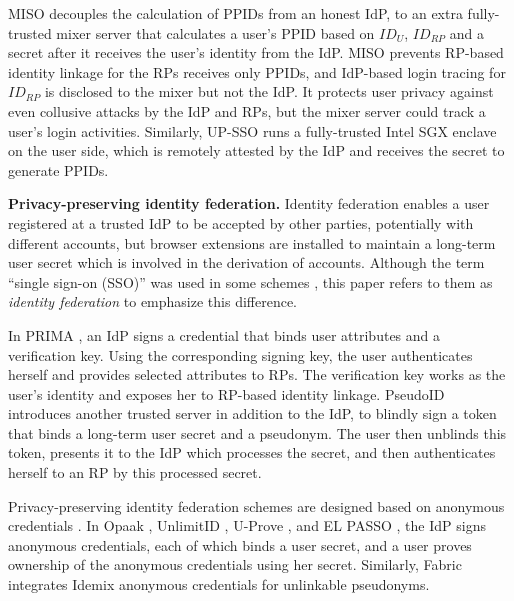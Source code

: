 MISO \cite{miso} decouples the calculation of PPIDs from an honest IdP,
 to an extra fully-trusted mixer server that calculates a user's PPID based on $ID_U$, $ID_{RP}$ and a secret after it receives the user's identity from the IdP.
MISO prevents RP-based identity linkage for the RPs receives only PPIDs,
    and IdP-based login tracing for $ID_{RP}$ is disclosed to the mixer but not the IdP.
It protects user privacy against even collusive attacks by the IdP and RPs,
    but the mixer server could track a user's login activities.
Similarly, UP-SSO \cite{up-sso} runs a fully-trusted Intel SGX enclave on the user side,
 which is remotely attested by the IdP and receives the secret to generate PPIDs. %

\noindent\textbf{Privacy-preserving identity federation.}
Identity federation enables a user registered at a trusted IdP to be accepted by other parties, potentially with different accounts,
but %
browser extensions are installed to maintain a long-term user secret
which is involved in the derivation of accounts.
Although the term ``single sign-on (SSO)'' was used in some schemes \cite{PseudoID, Opaak, ELPASSO, WangWS13, HanCSTW18, HanCSTWW20}, this paper refers to them as \emph{identity federation} to emphasize this difference.

In PRIMA \cite{prima}, an IdP signs a credential
that binds user attributes and  a verification key.
Using the corresponding signing key, the user authenticates herself and provides selected attributes to RPs. The verification key works as the user's identity and exposes her to RP-based identity linkage.
PseudoID \cite{PseudoID} introduces another trusted server in addition to the IdP,
 to blindly sign \cite{blind-sign}
a token that binds a long-term user secret and a pseudonym.
The user then unblinds this token,
        presents it to the IdP which processes the secret,
    and then authenticates herself to an RP by this processed secret.

Privacy-preserving identity federation schemes are designed based on anonymous credentials \cite{anon-credential-2001, idemix, anon-credential}.
In Opaak \cite{Opaak}, UnlimitID \cite{UnlimitID}, U-Prove \cite{uprov}, and EL PASSO \cite{ELPASSO}, the IdP signs anonymous credentials, each of which binds a user secret, %
and a user proves ownership of the anonymous credentials using her secret.
Similarly, Fabric \cite{hyperledge-idemix} integrates Idemix anonymous credentials \cite{idemix} for unlinkable pseudonyms. %


